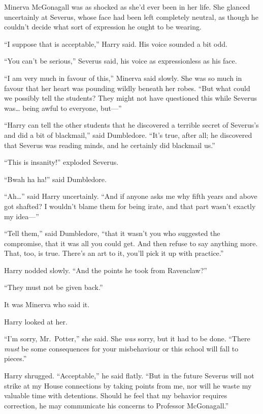 Minerva McGonagall was as shocked as she'd ever been in her life. She
glanced uncertainly at Severus, whose face had been left completely
neutral, as though he couldn't decide what sort of expression he ought
to be wearing.

``I suppose that is acceptable,'' Harry said. His voice sounded a bit
odd.

``You can't be serious,'' Severus said, his voice as expressionless as
his face.

``I am very much in favour of this,'' Minerva said slowly. She was so
much in favour that her heart was pounding wildly beneath her robes.
``But what could we possibly tell the students? They might not have
questioned this while Severus was\ldots{} being awful to everyone,
but---''

``Harry can tell the other students that he discovered a terrible secret
of Severus's and did a bit of blackmail,'' said Dumbledore. ``It's true,
after all; he discovered that Severus was reading minds, and he
certainly did blackmail us.''

``This is insanity!'' exploded Severus.

``Bwah ha ha!'' said Dumbledore.

``Ah\ldots{}'' said Harry uncertainly. ``And if anyone asks me why fifth
years and above got shafted? I wouldn't blame them for being irate, and
that part wasn't exactly my idea---''

``Tell them,'' said Dumbledore, ``that it wasn't you who suggested the
compromise, that it was all you could get. And then refuse to say
anything more. That, too, is true. There's an art to it, you'll pick it
up with practice.''

Harry nodded slowly. ``And the points he took from Ravenclaw?''

``They must not be given back.''

It was Minerva who said it.

Harry looked at her.

``I'm sorry, Mr.~Potter,'' she said. She \emph{was} sorry, but it had to
be done. ``There \emph{must} be some consequences for your misbehaviour
or this school will fall to pieces.''

Harry shrugged. ``Acceptable,'' he said flatly. ``But in the future
Severus will not strike at my House connections by taking points from
me, nor will he waste my valuable time with detentions. Should he feel
that my behavior requires correction, he may communicate his concerns to
Professor McGonagall.''

